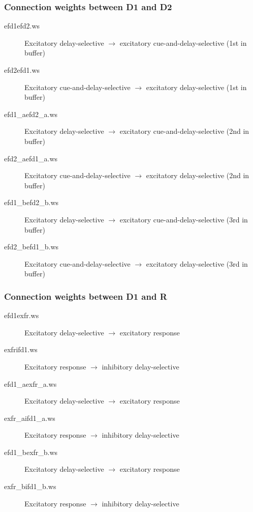 \documentclass[12pt]{article}
\begin{document}
\subsubsection{Connection weights between D1 and D2}
\begin{description}
  \item[efd1efd2.ws] Excitatory delay-selective $\rightarrow$
                     excitatory cue-and-delay-selective (1st in buffer)
  \item[efd2efd1.ws] Excitatory cue-and-delay-selective $\rightarrow$
                     excitatory delay-selective (1st in buffer)
  \item[efd1\_aefd2\_a.ws] Excitatory delay-selective $\rightarrow$
                     excitatory cue-and-delay-selective (2nd in buffer)
  \item[efd2\_aefd1\_a.ws] Excitatory cue-and-delay-selective $\rightarrow$
                     excitatory delay-selective (2nd in buffer)
  \item[efd1\_befd2\_b.ws] Excitatory delay-selective $\rightarrow$
                     excitatory cue-and-delay-selective (3rd in buffer)
  \item[efd2\_befd1\_b.ws] Excitatory cue-and-delay-selective $\rightarrow$
                     excitatory delay-selective (3rd in buffer)
\end{description}

\subsubsection{Connection weights between D1 and R}
\begin{description}
  \item[efd1exfr.ws] Excitatory delay-selective $\rightarrow$
                     excitatory response
  \item[exfrifd1.ws] Excitatory response $\rightarrow$
                     inhibitory delay-selective
  \item[efd1\_aexfr\_a.ws] Excitatory delay-selective $\rightarrow$
                     excitatory response
  \item[exfr\_aifd1\_a.ws] Excitatory response $\rightarrow$
                     inhibitory delay-selective
  \item[efd1\_bexfr\_b.ws] Excitatory delay-selective $\rightarrow$
                     excitatory response
  \item[exfr\_bifd1\_b.ws] Excitatory response $\rightarrow$
                     inhibitory delay-selective
\end{description}
\end{document}
